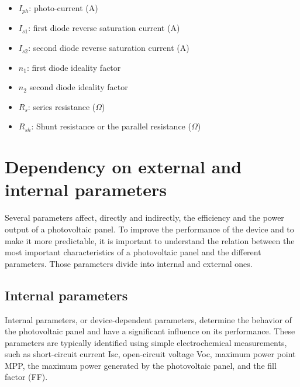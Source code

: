 \documentclass{report}
\begin{document}
\begin{itemize}
    \item $I_{ph}$: photo-current (A)
    \item $I_{s1}$: first diode reverse saturation current (A)
    \item $I_{s2}$: second diode reverse saturation current (A)
    \item  $n_{1}$: first diode ideality factor
    \item  $n_{2}$ second diode ideality factor
    \item $R_{s}$: series resistance ($\Omega$)
    \item $R_{sh}$: Shunt resistance or the parallel resistance ($\Omega$)
\end{itemize}

\section{Dependency on external and internal parameters}

Several parameters affect, directly and indirectly, the efficiency and the power output of a photovoltaic panel. To improve the performance of the device and to make it more predictable, it is important to understand the relation between the most important characteristics of a photovoltaic panel and the different parameters. Those parameters divide into internal and external ones\cite{texbook6}. 
\subsection{Internal parameters}
Internal parameters, or device-dependent parameters, determine the behavior of the photovoltaic panel and have a significant influence on its performance. These parameters are typically identified using simple electrochemical measurements, such as short-circuit current Isc, open-circuit voltage Voc, maximum power point MPP, the maximum power generated by the photovoltaic panel, and the fill factor (FF).
\end{document}
